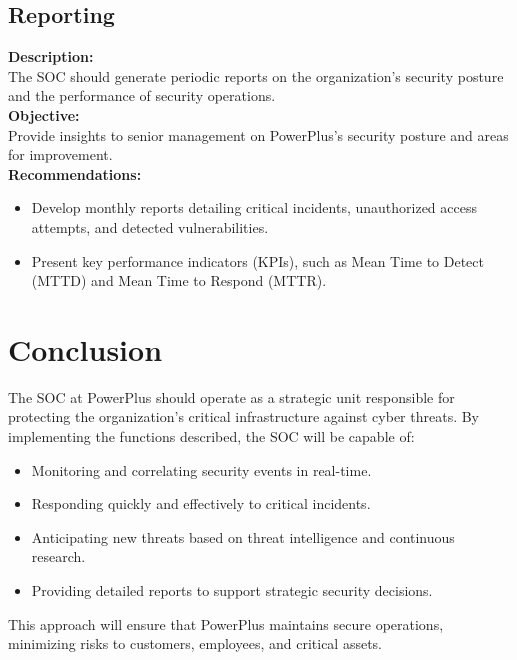 \subsection*{ Reporting}
\textbf{Description:} \\
The SOC should generate periodic reports on the organization's security posture and the performance of security operations. \\

\textbf{Objective:} \\
Provide insights to senior management on PowerPlus’s security posture and areas for improvement. \\

\textbf{Recommendations:}
\begin{itemize}
    \item Develop monthly reports detailing critical incidents, unauthorized access attempts, and detected vulnerabilities.
    \item Present key performance indicators (KPIs), such as Mean Time to Detect (MTTD) and Mean Time to Respond (MTTR).
\end{itemize}

\section*{Conclusion}
The SOC at PowerPlus should operate as a strategic unit responsible for protecting the organization's critical infrastructure against cyber threats. By implementing the functions described, the SOC will be capable of:
\begin{itemize}
    \item Monitoring and correlating security events in real-time.
    \item Responding quickly and effectively to critical incidents.
    \item Anticipating new threats based on threat intelligence and continuous research.
    \item Providing detailed reports to support strategic security decisions.
\end{itemize}
This approach will ensure that PowerPlus maintains secure operations, minimizing risks to customers, employees, and critical assets.
